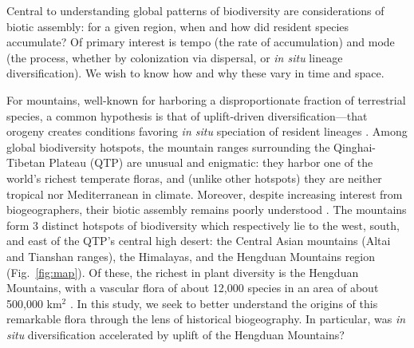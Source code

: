 

Central to understanding global patterns of biodiversity are
considerations of biotic assembly: for a given region, when and how
did resident species accumulate? Of primary interest is tempo (the
rate of accumulation) and mode (the process, whether by colonization
via dispersal, or \textit{in situ} lineage diversification). We wish
to know how and why these vary in time and space.

For mountains, well-known for harboring a disproportionate fraction of
terrestrial species, a common hypothesis is that of uplift-driven
diversification---that orogeny creates conditions favoring \textit{in
  situ} speciation of resident lineages
\citep{Hoorn2013,hughes2016,Wen2014,Favre2015,Lagomarsino2016,schwery2015}. Among
global biodiversity hotspots, the mountain ranges surrounding the
Qinghai-Tibetan Plateau (QTP) are unusual and enigmatic: they harbor
one of the world's richest temperate floras, and (unlike other
hotspots) they are neither tropical nor Mediterranean in
climate. Moreover, despite increasing interest from biogeographers,
their biotic assembly remains poorly understood
\citep{Favre2015,Wen2014,Hughes2015}. The mountains form 3 distinct
hotspots of biodiversity which respectively lie to the west, south,
and east of the QTP's central high desert: the Central Asian mountains
(Altai and Tianshan ranges), the Himalayas, and the Hengduan Mountains
region \citep{Favre2015} (Fig.~\ref{fig:map}). Of these, the richest
in plant diversity is the Hengduan Mountains, with a vascular flora of
about 12,000 species in an area of about 500,000 km$^2$
\citep{Boufford2014,LiEtLi1993,Wu1988}. In this study, we seek to
better understand the origins of this remarkable flora through the
lens of historical biogeography. In particular, was \textit{in situ}
diversification accelerated by uplift of the Hengduan Mountains?


